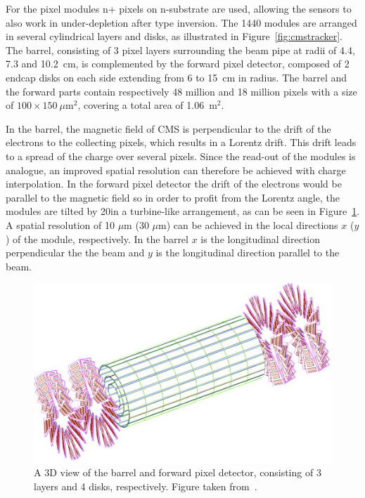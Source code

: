For the pixel modules n+ pixels on n-substrate are used, allowing the sensors to also work in under-depletion after type inversion. The 1440 modules are arranged in several cylindrical layers and disks, as illustrated in Figure~\ref{fig:cmstracker}. The barrel, consisting of 3 pixel layers surrounding the beam pipe at radii of 4.4, 7.3 and 10.2~cm, is complemented by the forward pixel detector, composed of 2 endcap disks on each side extending from 6 to 15~cm in radius. The barrel and the forward parts contain respectively 48 million and 18 million pixels with a size of $100 \times 150\ \mu\mathrm{m}^2$, covering a total area of 1.06~m$^2$.

In the barrel, the magnetic field of CMS is perpendicular to the drift of the electrons to the collecting pixels, which results in a Lorentz drift. This drift leads to a spread of the charge over several pixels. Since the read-out of the modules is analogue, an improved spatial resolution can therefore be achieved with charge interpolation. In the forward pixel detector the drift of the electrons would be parallel to the magnetic field so in order to profit from the Lorentz angle, the modules are tilted by 20\degree in a turbine-like arrangement, as can be seen in Figure~\ref{fig:pix}. A spatial resolution of 10 $\mu$m (30 $\mu$m) can be achieved in the local directions $x$ ($y$) of the module, respectively. In the barrel $x$ is the longitudinal direction perpendicular the the beam and $y$ is the longitudinal direction parallel to the beam. 

\begin{figure}[ht]
  \centering
 \includegraphics[width=.6\textwidth]{pixel.jpg}
 \caption{A 3D view of the barrel and forward pixel detector, consisting of 3 layers and 4 disks, respectively. Figure taken from~\cite{Bayatian:2006nff}.}
 \label{fig:pix}
\end{figure}

